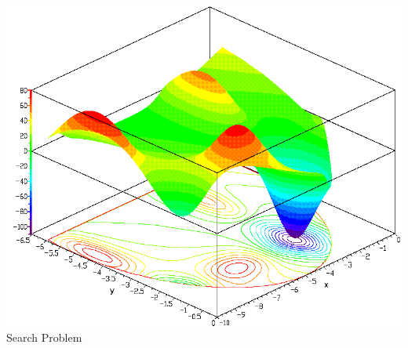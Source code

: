 \documentclass[10pt, compress, aspectratio=169]{beamer}
\begin{document}
\begin{frame}
\begin{columns}[c]
            \begin{block}{}
                \begin{center}
                    \includegraphics[width=\columnwidth]{sample_search_space}
                    \alert{Search Problem}
                \end{center}
            \end{block}

    \end{columns}
\end{frame}
\end{document}
